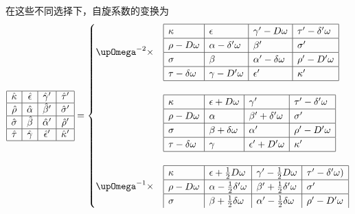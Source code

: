 在这些不同选择下，自旋系数的变换为
\begin{equation*}
	\begin{array}{|c|c|c|c|}
		\hline
		\hat{\kappa } & \hat{\epsilon } & \hat{\gamma } ' & \hat{\tau } '\\
		\hline
		\hat{\rho } & \hat{\alpha } & \hat{\beta } ' & \hat{\sigma } '\\
		\hline
		\hat{\sigma } & \hat{\beta } & \hat{\alpha } ' & \hat{\rho } '\\
		\hline
		\hat{\tau } & \hat{\gamma } & \hat{\epsilon } ' & \hat{\kappa } '\\
		\hline
	\end{array} =\begin{cases}
		\upOmega^{-2} \times  & \begin{array}{|l|l|l|l|}
			\hline
			\kappa  & \epsilon  & \gamma '-D\omega  & \tau '-\delta '\omega \\
			\hline
			\rho -D\omega  & \alpha -\delta '\omega  & \beta ' & \sigma '\\
			\hline
			\sigma  & \beta  & \alpha '-\delta \omega  & \rho '-D'\omega \\
			\hline
			\tau -\delta \omega  & \gamma -D'\omega  & \epsilon ' & \kappa '\\
			\hline
		\end{array}\\ \\
		& \begin{array}{|l|l|l|l|}
			\hline
			\kappa  & \epsilon +D\omega  & \gamma ' & \tau '-\delta '\omega \\
			\hline
			\rho -D\omega  & \alpha  & \beta '+\delta '\omega  & \sigma '\\
			\hline
			\sigma  & \beta +\delta \omega  & \alpha ' & \rho '-D'\omega \\
			\hline
			\tau -\delta \omega  & \gamma  & \epsilon '+D'\omega  & \kappa '\\
			\hline
		\end{array}\\ \\
		\upOmega^{-1} \times  & \begin{array}{|l|l|l|l|}
			\hline
			\kappa  & \epsilon +\frac{1}{2} D\omega  & \gamma '-\frac{1}{2} D\omega  & \tau '-\delta '\omega )\\
			\hline
			\rho -D\omega  & \alpha -\frac{1}{2} \delta '\omega  & \beta '+\frac{1}{2} \delta '\omega  & \sigma '\\
			\hline
			\sigma  & \beta +\frac{1}{2} \delta \omega  & \alpha '-\frac{1}{2} \delta \omega  & \rho '-D'\omega \\

\end{array}
\end{cases}
\end{equation*}
